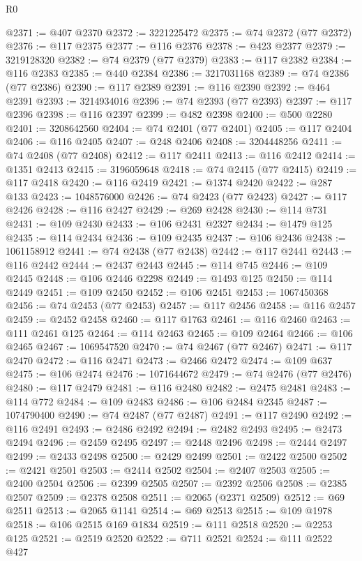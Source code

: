 \begin{lexlean}{R0}
\begin{coremodule}
@2371 := @407 @2370
@2372 := 3221225472
@2375 := @74 @2372 (@77 @2372)
@2376 := @117 @2375
@2377 := @116 @2376
@2378 := @423 @2377
@2379 := 3219128320
@2382 := @74 @2379 (@77 @2379)
@2383 := @117 @2382
@2384 := @116 @2383
@2385 := @440 @2384
@2386 := 3217031168
@2389 := @74 @2386 (@77 @2386)
@2390 := @117 @2389
@2391 := @116 @2390
@2392 := @464 @2391
@2393 := 3214934016
@2396 := @74 @2393 (@77 @2393)
@2397 := @117 @2396
@2398 := @116 @2397
@2399 := @482 @2398
@2400 := @500 @2280
@2401 := 3208642560
@2404 := @74 @2401 (@77 @2401)
@2405 := @117 @2404
@2406 := @116 @2405
@2407 := @248 @2406
@2408 := 3204448256
@2411 := @74 @2408 (@77 @2408)
@2412 := @117 @2411
@2413 := @116 @2412
@2414 := @1351 @2413
@2415 := 3196059648
@2418 := @74 @2415 (@77 @2415)
@2419 := @117 @2418
@2420 := @116 @2419
@2421 := @1374 @2420
@2422 := @287 @133
@2423 := 1048576000
@2426 := @74 @2423 (@77 @2423)
@2427 := @117 @2426
@2428 := @116 @2427
@2429 := @269 @2428
@2430 := @114 @731
@2431 := @109 @2430
@2433 := @106 @2431 @2327
@2434 := @1479 @125
@2435 := @114 @2434
@2436 := @109 @2435
@2437 := @106 @2436
@2438 := 1061158912
@2441 := @74 @2438 (@77 @2438)
@2442 := @117 @2441
@2443 := @116 @2442
@2444 := @2437 @2443
@2445 := @114 @745
@2446 := @109 @2445
@2448 := @106 @2446 @2298
@2449 := @1493 @125
@2450 := @114 @2449
@2451 := @109 @2450
@2452 := @106 @2451
@2453 := 1067450368
@2456 := @74 @2453 (@77 @2453)
@2457 := @117 @2456
@2458 := @116 @2457
@2459 := @2452 @2458
@2460 := @117 @1763
@2461 := @116 @2460
@2463 := @111 @2461 @125
@2464 := @114 @2463
@2465 := @109 @2464
@2466 := @106 @2465
@2467 := 1069547520
@2470 := @74 @2467 (@77 @2467)
@2471 := @117 @2470
@2472 := @116 @2471
@2473 := @2466 @2472
@2474 := @109 @637
@2475 := @106 @2474
@2476 := 1071644672
@2479 := @74 @2476 (@77 @2476)
@2480 := @117 @2479
@2481 := @116 @2480
@2482 := @2475 @2481
@2483 := @114 @772
@2484 := @109 @2483
@2486 := @106 @2484 @2345
@2487 := 1074790400
@2490 := @74 @2487 (@77 @2487)
@2491 := @117 @2490
@2492 := @116 @2491
@2493 := @2486 @2492
@2494 := @2482 @2493
@2495 := @2473 @2494
@2496 := @2459 @2495
@2497 := @2448 @2496
@2498 := @2444 @2497
@2499 := @2433 @2498
@2500 := @2429 @2499
@2501 := @2422 @2500
@2502 := @2421 @2501
@2503 := @2414 @2502
@2504 := @2407 @2503
@2505 := @2400 @2504
@2506 := @2399 @2505
@2507 := @2392 @2506
@2508 := @2385 @2507
@2509 := @2378 @2508
@2511 := @2065 (@2371 @2509)
@2512 := @69 @2511
@2513 := @2065 @1141
@2514 := @69 @2513
@2515 := @109 @1978
@2518 := @106 @2515 @169 @1834
@2519 := @111 @2518
@2520 := @2253 @125
@2521 := @2519 @2520
@2522 := @711 @2521
@2524 := @111 @2522 @427

\end{coremodule}
\end{lexlean}
